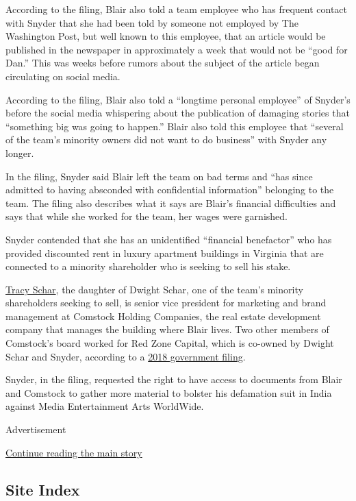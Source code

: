According to the filing, Blair also told a team employee who has
frequent contact with Snyder that she had been told by someone not
employed by The Washington Post, but well known to this employee, that
an article would be published in the newspaper in approximately a week
that would not be ``good for Dan.'' This was weeks before rumors about
the subject of the article began circulating on social media.

According to the filing, Blair also told a ``longtime personal
employee'' of Snyder's before the social media whispering about the
publication of damaging stories that ``something big was going to
happen.'' Blair also told this employee that ``several of the team's
minority owners did not want to do business'' with Snyder any longer.

In the filing, Snyder said Blair left the team on bad terms and ``has
since admitted to having absconded with confidential information''
belonging to the team. The filing also describes what it says are
Blair's financial difficulties and says that while she worked for the
team, her wages were garnished.

Snyder contended that she has an unidentified ``financial benefactor''
who has provided discounted rent in luxury apartment buildings in
Virginia that are connected to a minority shareholder who is seeking to
sell his stake.

\href{https://ir.comstockcompanies.com/governance/board-of-directors/person-details/default.aspx?ItemId=85483487-ac3c-4167-8922-9b2ef50ddfce}{Tracy
Schar}, the daughter of Dwight Schar, one of the team's minority
shareholders seeking to sell, is senior vice president for marketing and
brand management at Comstock Holding Companies, the real estate
development company that manages the building where Blair lives. Two
other members of Comstock's board worked for Red Zone Capital, which is
co-owned by Dwight Schar and Snyder, according to a
\href{https://www.sec.gov/Archives/edgar/data/1299969/000119312518195633/d612406d8k.htm}{2018
government filing}.

Snyder, in the filing, requested the right to have access to documents
from Blair and Comstock to gather more material to bolster his
defamation suit in India against Media Entertainment Arts WorldWide.

Advertisement

\protect\hyperlink{after-bottom}{Continue reading the main story}

\hypertarget{site-index}{%
\subsection{Site Index}\label{site-index}}

